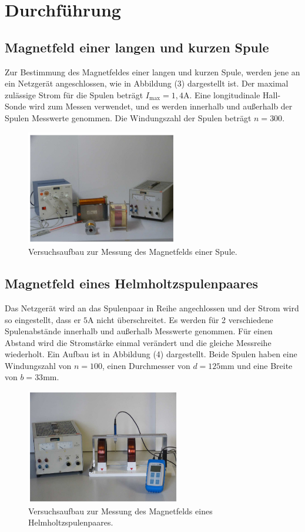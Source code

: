 \section{Durchführung}
\label{sec:Durchführung}

\subsection{Magnetfeld einer langen und kurzen Spule}
Zur Bestimmung des Magnetfeldes einer langen und kurzen Spule, werden jene an ein Netzgerät angeschlossen, wie in Abbildung (3) dargestellt ist.
Der maximal zulässige Strom für die Spulen beträgt $I_\text{max} = 1,4 \si{\ampere}$. 
Eine longitudinale Hall-Sonde wird zum Messen verwendet, und es werden innerhalb und außerhalb der Spulen Messwerte genommen. 
Die Windungszahl der Spulen beträgt $n = 300$.
\begin{figure}[H]
  \centering
  \includegraphics[height=5cm]{eins.png}
  \caption{Versuchsaufbau zur Messung des Magnetfelds einer Spule. \cite[S. 4]{sample}}
\end{figure}
\subsection{Magnetfeld eines Helmholtzspulenpaares}
Das Netzgerät wird an das Spulenpaar in Reihe angechlossen und der Strom wird so eingestellt, dass er $5 \si{\ampere} $ nicht überschreitet.
Es werden für 2 verschiedene Spulenabstände innerhalb und außerhalb Messwerte genommen. Für einen Abstand wird die Stromstärke einmal verändert und die gleiche Messreihe wiederholt.
Ein Aufbau ist in Abbildung (4) dargestellt. Beide Spulen haben eine Windungszahl von $n=100$, einen Durchmesser von $d=125 \si{\milli\meter}$ und eine Breite von $b=33 \si{\milli\meter}$.
\begin{figure}[H]
  \centering
  \includegraphics[height=5cm]{zwei.png}
  \caption{Versuchsaufbau zur Messung des Magnetfelds eines Helmholtzspulenpaares. \cite[S. 5]{sample}}
\end{figure}
